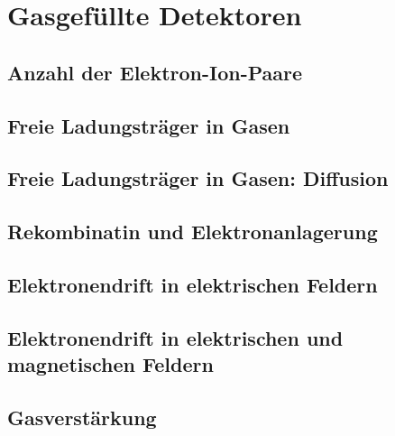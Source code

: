 \documentclass{article}
\begin{document}
% 		
% 				


\section{Gasgefüllte Detektoren}
\graphicspath{{bilder/3-1/}}

	\subsection{Anzahl der Elektron-Ion-Paare}
		
	\subsection{Freie Ladungsträger in Gasen}
		
	\subsection{Freie Ladungsträger in Gasen: Diffusion}
		
	\subsection{Rekombinatin und Elektronanlagerung}
		
	\subsection{Elektronendrift in elektrischen Feldern}
		
	\subsection{Elektronendrift in elektrischen und magnetischen Feldern}
		
	\subsection{Gasverstärkung}
		
				
				
\end{document}
